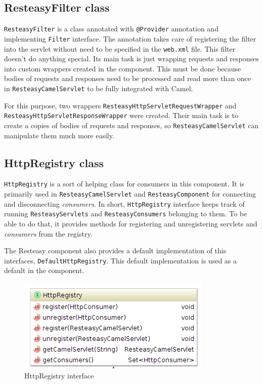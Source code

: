 \documentclass[12pt,final,oneside]{fithesis2}
\begin{document}
\subsection*{ResteasyFilter class}
\texttt{ResteasyFilter} is a class annotated with \texttt{@Provider} annotation and implementing \texttt{Filter} interface. The annotation takes care of registering the filter into the servlet without need to be specified in the \texttt{web.xml} file. This filter doesn't do anything special. Its main task is just wrapping requests and responses into custom wrappers created in the component. This must be done because bodies of requests and responses need to be processed and read more than once in \texttt{ResteasyCamelServlet} to be fully integrated with Camel.

For this purpose, two wrappers \texttt{ResteasyHttpServletRequestWrap\-per} and \texttt{ResteasyHttpServletResponseWrapper} were created. Their main task is to create a copies of bodies of requests and responses, so  \texttt{ResteasyCamelServlet} can manipulate them much more easily.


\subsection{HttpRegistry class}\label{registry}
\texttt{HttpRegistry} is a sort of helping class for consumers in this component. It is primarily used in \texttt{ResteasyCamelServlet} and \texttt{ResteasyComponent} for connecting and disconnecting \textit{consumers}. In short, \texttt{HttpRegistry} interface keeps track of running \texttt{ResteasyServlets} and \texttt{ResteasyConsu\-mers} belonging to them.  To be able to do that, it provides methods for registering and unregistering servlets and \textit{consumers} from the registry.

The Resteasy component also provides a default implementation of this interfaces, \texttt{DefaultHttpRegistry}. This default implementation is used as a default in the component. 

\begin{figure}[!h]
\centering
\includegraphics[width=0.8\linewidth]{images/registry.png}
\caption{HttpRegistry interface}
\label{comp}
\end{figure}
\end{document}
